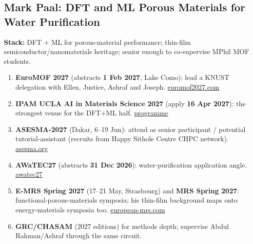 \documentclass[11pt,a4paper]{article}
\begin{document}
\subsection{Mark Paal: DFT and ML Porous Materials for Water Purification}
\textbf{Stack:} DFT $+$ ML for porous-material performance; thin-film semiconductor/nanomaterials heritage; senior enough to co-supervise MPhil MOF students.
\begin{enumerate}[leftmargin=1.6em]
  \item \textbf{EuroMOF 2027} (abstracts \textbf{1 Feb 2027}, Lake Como): lead a KNUST delegation with Ellen, Justice, Ashraf and Joseph. \href{https://euromof2027.com/}{euromof2027.com}
  \item \textbf{IPAM UCLA AI in Materials Science 2027} (apply \textbf{16 Apr 2027}): the strongest venue for the DFT$+$ML half. \href{https://atomgrants.com/grant/artificial-intelligence-materials-science-institute-for-pure-and-applied-mathematics}{programme}
  \item \textbf{ASESMA-2027} (Dakar, 6--19 Jun): attend as senior participant / potential tutorial-assistant (recruits from Happy Sithole Centre CHPC network). \href{https://asesma.org/programs}{asesma.org}
  \item \textbf{AWaTEC27} (abstracts \textbf{31 Dec 2026}): water-purification application angle. \href{https://awatec27.dista.uninsubria.it/}{awatec27}
  \item \textbf{E-MRS Spring 2027} (17--21 May, Strasbourg) and \textbf{MRS Spring 2027}: functional-porous-materials symposia; his thin-film background maps onto energy-materials symposia too. \href{https://www.european-mrs.com/meetings/2027-spring-meeting-exhibit}{european-mrs.com}
  \item \textbf{GRC/CHASAM} (2027 editions) for methods depth; supervise Abdul Rahman/Ashraf through the same circuit.
\end{enumerate}
\end{document}
